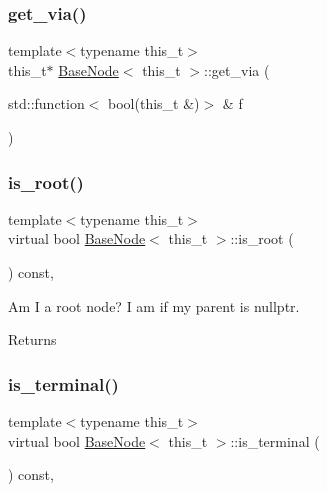 \mbox{\label{class_base_node_add31235ad96e659230cbca6c9e357523}} 
\subsubsection{\texorpdfstring{get\+\_\+via()}{get\_via()}}
{\footnotesize\ttfamily template$<$typename this\+\_\+t$>$ \\
this\+\_\+t$\ast$ \hyperlink{class_base_node}{Base\+Node}$<$ this\+\_\+t $>$\+::get\+\_\+via (\begin{DoxyParamCaption}\item[{std\+::function$<$ bool(this\+\_\+t \&)$>$ \&}]{f }\end{DoxyParamCaption})\hspace{0.3cm}{\ttfamily [inline]}}

\mbox{\label{class_base_node_afce604388d562d347fcb31aeb2a8ef03}} 
\subsubsection{\texorpdfstring{is\+\_\+root()}{is\_root()}}
{\footnotesize\ttfamily template$<$typename this\+\_\+t$>$ \\
virtual bool \hyperlink{class_base_node}{Base\+Node}$<$ this\+\_\+t $>$\+::is\+\_\+root (\begin{DoxyParamCaption}{ }\end{DoxyParamCaption}) const\hspace{0.3cm}{\ttfamily [inline]}, {\ttfamily [virtual]}}

Am I a root node? I am if my parent is nullptr. \begin{DoxyReturn}{Returns}

\end{DoxyReturn}
\mbox{\label{class_base_node_af37331cbec1b32c874138d2ae9b89745}} 
\subsubsection{\texorpdfstring{is\+\_\+terminal()}{is\_terminal()}}
{\footnotesize\ttfamily template$<$typename this\+\_\+t$>$ \\
virtual bool \hyperlink{class_base_node}{Base\+Node}$<$ this\+\_\+t $>$\+::is\+\_\+terminal (\begin{DoxyParamCaption}{ }\end{DoxyParamCaption}) const\hspace{0.3cm}{\ttfamily [inline]}, {\ttfamily [virtual]}}

